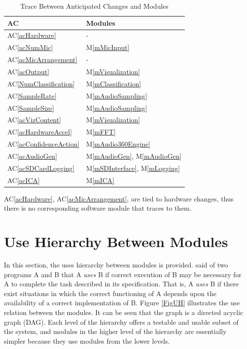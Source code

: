 \documentclass[12pt, titlepage]{article}
\newcommand{\acref}[1]{AC\ref{#1}}
\newcommand{\mref}[1]{M\ref{#1}}
\begin{document}
\begin{table}[H]
\centering
\begin{tabular}{p{} p{}}
\toprule
\textbf{AC} & \textbf{Modules}\\
\midrule
\acref{acHardware} & -\\
\acref{acNumMic} & \mref{mMicInput}\\
\acref{acMicArrangement} & -\\
\acref{acOutput} & \mref{mVisualization}\\
\acref{NumClassification} & \mref{mClassification}\\
\acref{SampleRate} & \mref{mAudioSampling}\\
\acref{SampleSize} & \mref{mAudioSampling}\\
\acref{acVizContent} & \mref{mVisualization}\\
\acref{acHardwareAccel} & \mref{mFFT}\\
\acref{acConfidenceAction} & \mref{mAudio360Engine}\\
\acref{acAudioGen} & \mref{mAudioGen}, \mref{mAudioGen} \\
\acref{acSDCardLogging} & \mref{mSDInterface}, \mref{mLogging} \\
\acref{acICA} & \mref{mICA}\\
\bottomrule
\end{tabular}
\caption{Trace Between Anticipated Changes and Modules}
\label{TblACT}
\end{table}

\acref{acHardware}, \acref{acMicArrangement}, are tied to hardware changes, thus
there is no corresponding software module that traces to them.

\section{Use Hierarchy Between Modules} \label{SecUse}

In this section, the uses hierarchy between modules is provided.
\cite{Parnas1978} said of two programs A and B that A {\em uses} B if correct
execution of B may be necessary for A to complete the task described in its
specification. That is, A {\em uses} B if there exist situations in which the
correct functioning of A depends upon the availability of a correct
implementation of B.  Figure \ref{FigUH} illustrates the use relation between
the modules. It can be seen that the graph is a directed acyclic graph (DAG).
Each level of the hierarchy offers a testable and usable subset of the system,
and modules in the higher level of the hierarchy are essentially simpler because
they use modules from the lower levels.
\end{document}
